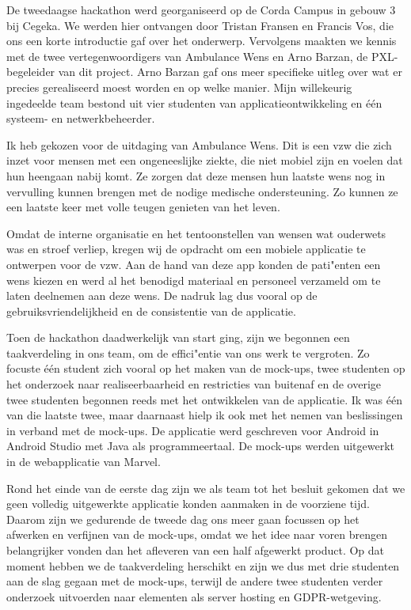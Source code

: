 
De tweedaagse hackathon werd georganiseerd op de Corda Campus in gebouw 3 bij Cegeka. We werden hier ontvangen door Tristan Fransen en Francis Vos, die ons een korte introductie gaf over het onderwerp. Vervolgens maakten we kennis met de twee vertegenwoordigers van Ambulance Wens en Arno Barzan, de PXL\hyp{}begeleider van dit project. Arno Barzan gaf ons meer specifieke uitleg over wat er precies gerealiseerd moest worden en op welke manier. Mijn willekeurig ingedeelde team bestond uit vier studenten van applicatieontwikkeling en één systeem\hyp{} en netwerkbeheerder.

Ik heb gekozen voor de uitdaging van Ambulance Wens. Dit is een vzw die zich inzet voor mensen met een ongeneeslijke ziekte, die niet mobiel zijn en voelen dat hun heengaan nabij komt. Ze zorgen dat deze mensen hun laatste wens nog in vervulling kunnen brengen met de nodige medische ondersteuning. Zo kunnen ze een laatste keer met volle teugen genieten van het leven.

Omdat de interne organisatie en het tentoonstellen van wensen wat ouderwets was en stroef verliep, kregen wij de opdracht om een mobiele applicatie te ontwerpen voor de vzw. Aan de hand van deze app konden de pati"enten een wens kiezen en werd al het benodigd materiaal en personeel verzameld om te laten deelnemen aan deze wens. De nadruk lag dus vooral op de gebruiksvriendelijkheid en de consistentie van de applicatie.

Toen de hackathon daadwerkelijk van start ging, zijn we begonnen een taakverdeling in ons team, om de effici"entie van ons werk te vergroten. Zo focuste één student zich vooral op het maken van de mock\hyp{}ups, twee studenten op het onderzoek naar realiseerbaarheid en restricties van buitenaf en de overige twee studenten begonnen reeds met het ontwikkelen van de applicatie. Ik was één van die laatste twee, maar daarnaast hielp ik ook met het nemen van beslissingen in verband met de mock\hyp{}ups. De applicatie werd geschreven voor Android in Android Studio met Java als programmeertaal. De mock\hyp{}ups werden uitgewerkt in de webapplicatie van Marvel.

Rond het einde van de eerste dag zijn we als team tot het besluit gekomen dat we geen volledig uitgewerkte applicatie konden aanmaken in de voorziene tijd. Daarom zijn we gedurende de tweede dag ons meer gaan focussen op het afwerken en verfijnen van de mock\hyp{}ups, omdat we het idee naar voren brengen belangrijker vonden dan het afleveren van een half afgewerkt product. Op dat moment hebben we de taakverdeling herschikt en zijn we dus met drie studenten aan de slag gegaan met de mock\hyp{}ups, terwijl de andere twee studenten verder onderzoek uitvoerden naar elementen als server hosting en GDPR\hyp{}wetgeving.

